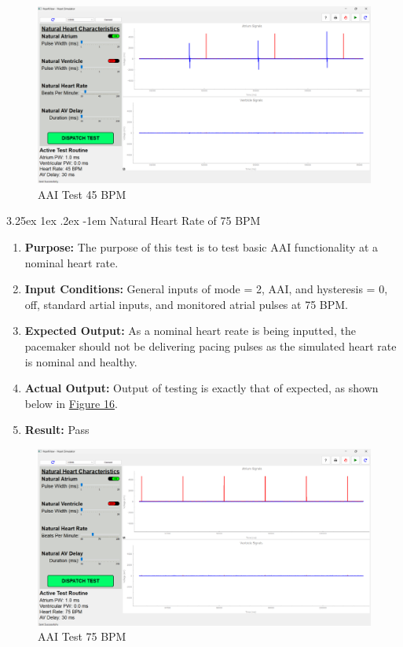 \documentclass{article}
\makeatletter
\renewcommand\paragraph{\@startsection{paragraph}{5}{\z@}%
  {3.25ex \@plus1ex \@minus.2ex}%
  {-1em}%
  {\normalfont\normalsize\bfseries}}
\makeatother
\begin{document}
\begin{tcolorbox}
    \begin{figure}[H]\label{AAItest45}
        \includegraphics[width=\textwidth]{AAItest45.png}
        \caption{AAI Test 45 BPM}      
    \end{figure}
\end{tcolorbox}

\newpage
\paragraph{Natural Heart Rate of 75 BPM}

\begin{enumerate}[label=]
   \item \textbf{Purpose:} The purpose of this test is to test basic AAI functionality at a nominal heart rate.
   \item \textbf{Input Conditions:} General inputs of mode = 2, AAI, and hysteresis = 0, off, standard 
   artial inputs, and monitored atrial pulses at 75 BPM.
   \item \textbf{Expected Output:} As a nominal heart reate is being inputted, the pacemaker should not be delivering pacing pulses 
   as the simulated heart rate is nominal and healthy.
   \item \textbf{Actual Output:} Output of testing is exactly that of expected, as shown below in \hyperref[AAItest75]{Figure 16}.
   \item \textbf{Result:} Pass
\end{enumerate}

\begin{tcolorbox}
    \begin{figure}[H]\label{AAItest75}
        \includegraphics[width=\textwidth]{AAItest75.png}
        \caption{AAI Test 75 BPM}
    \end{figure}
\end{tcolorbox}
\end{document}
